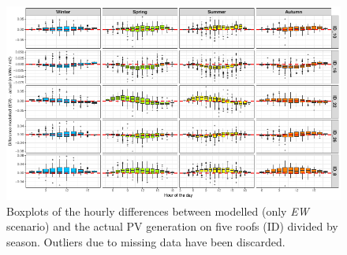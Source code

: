 \begin{figure}[tb]
\centering\includegraphics[width=\linewidth]{images/Figs/hourly_compare.pdf}
\caption{Boxplots of the hourly differences between modelled (only \textit{EW} scenario) and the actual PV generation on five roofs (ID) divided by season. Outliers due to missing data have been discarded.}
\label{fig:valid_boxplots}
\end{figure}

